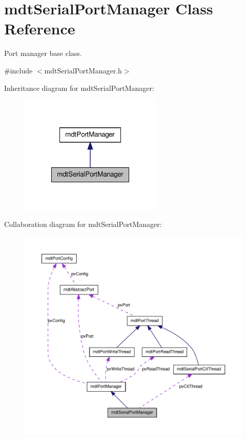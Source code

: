 \hypertarget{classmdt_serial_port_manager}{
\section{mdtSerialPortManager Class Reference}
\label{classmdt_serial_port_manager}
}


Port manager base class.  




{\ttfamily \#include $<$mdtSerialPortManager.h$>$}



Inheritance diagram for mdtSerialPortManager:\nopagebreak
\begin{figure}[H]
\begin{center}
\leavevmode
\includegraphics[width=192pt]{classmdt_serial_port_manager__inherit__graph}
\end{center}
\end{figure}


Collaboration diagram for mdtSerialPortManager:\nopagebreak
\begin{figure}[H]
\begin{center}
\leavevmode
\includegraphics[width=400pt]{classmdt_serial_port_manager__coll__graph}
\end{center}
\end{figure}
